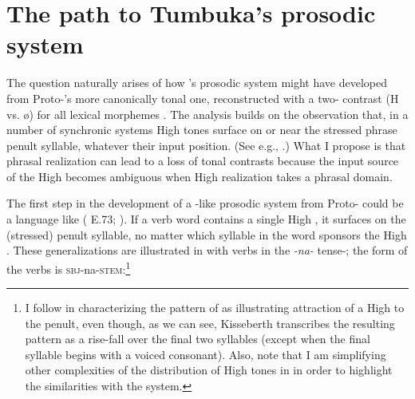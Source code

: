 \documentclass[output=paper
,newtxmath
,modfonts
,nonflat]{langsci/langscibook}
\begin{document}
\section{The path to Tumbuka’s prosodic system}\label{sec:downing:4}

The question naturally arises of how ’s prosodic system might have developed from Proto-’s more canonically tonal one, reconstructed with a two- contrast (H vs. ø) for all lexical morphemes \citep{Meeussen1967}. The analysis builds on the observation that, in a number of synchronic   systems High tones surface on or near the stressed phrase penult syllable, whatever their input position. (See e.g., 
\citealt{McCawley1978,Clemens&Goldsmith1984, Philippson1998, Kisseberth&Odden2003, Downing2010phrasing}.) What I propose is that phrasal  realization can lead to a loss of tonal contrasts because the input source of the High  becomes ambiguous when High  realization takes a phrasal domain.

The first step in the development of a -like prosodic system from Proto- could be a language like  ( E.73; \citealt{Kisseberth1984}). If a verb word contains a single High , it surfaces on the (stressed) penult syllable, no matter which syllable in the word sponsors the High . These generalizations are illustrated in  with verbs in the \textit{{}-na-} tense-; the form of the verbs is \textsc{sbj}{}-na-\textsc{stem}:\footnote{I follow \citet{Kisseberth1984} in characterizing the  pattern of  as illustrating attraction of a High  to the penult, even though, as we can see, Kisseberth transcribes the resulting  pattern as a rise-fall over the final two syllables (except when the final syllable begins with a voiced consonant). Also, note that I am simplifying other complexities of the distribution of High tones in  in order to highlight the similarities with the  system.}

 \begin{comment}
\ea%
    \label{bkm:Ref97286246}
    \langinfo{lg}{fam}{src}\\
    \gll \\  
        \\
    \glt
    \z
\end{comment}
\end{document}
